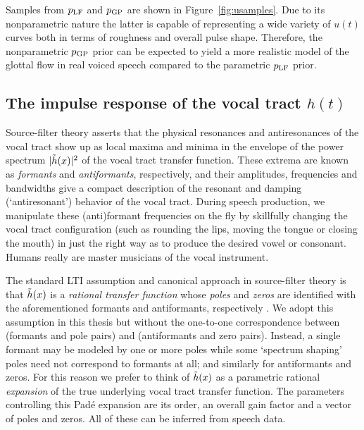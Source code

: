 \begin{chaptersections}
Samples from $p_{\text{LF}}$ and $p_{\text{GP}}$ are shown in Figure~\ref{fig:usamples}.
Due to its nonparametric nature the latter is capable of representing a wide variety of $u(t)$ curves both in terms of roughness and overall pulse shape.
Therefore, the nonparametric $p_{\text{GP}}$ prior can be expected to yield a more realistic model of the glottal flow in real voiced speech compared to the parametric $p_{\text{LF}}$ prior.

\subsection{The impulse response of the vocal tract $h(t)$\label{sec:irvt}}

Source-filter theory asserts that the physical resonances and antiresonances of the vocal tract show up as local maxima and minima in the envelope of the power spectrum $|\tilde{h}(x)|^2$ of the vocal tract transfer function.
These extrema are known as \emph{formants} and \emph{antiformants}, respectively, and their amplitudes, frequencies and bandwidths give a compact description of the resonant and damping (`antiresonant') behavior of the vocal tract.
During speech production, we manipulate these (anti)formant frequencies on the fly by skillfully changing the vocal tract configuration (such as rounding the lips, moving the tongue or closing the mouth) in just the right way as to produce the desired vowel or consonant.
Humans really are master musicians of the vocal instrument.

The standard LTI assumption and canonical approach in source-filter theory is that $\tilde{h}(x)$ is a \emph{rational transfer function} whose \emph{poles} and \emph{zeros} are identified with the aforementioned formants and antiformants, respectively \citep{Stevens2000}.
We adopt this assumption in this thesis but without the one-to-one correspondence between (formants and pole pairs) and (antiformants and zero pairs).
Instead, a single formant may be modeled by one or more poles while some `spectrum shaping' poles need not correspond to formants at all; and similarly for antiformants and zeros. %
For this reason we prefer to think of $\tilde{h}(x)$ as a parametric rational \emph{expansion} of the true underlying vocal tract transfer function.
The parameters controlling this Padé expansion are its order, an overall gain factor and a vector of poles and zeros.
All of these can be inferred from speech data.


\end{chaptersections}
